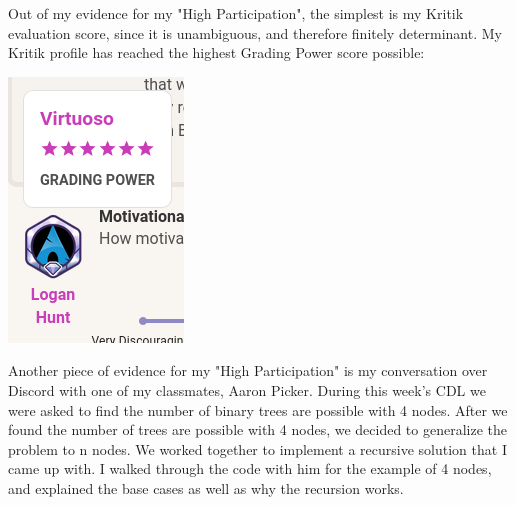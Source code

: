 \documentclass[11pt]{article}
\begin{document}
Out of my evidence for my "High Participation", the simplest is my Kritik evaluation score,
since it is unambiguous, and therefore finitely determinant. My Kritik profile has reached the
highest Grading Power score possible:
\begin{center}
\includegraphics[width=.9\linewidth]{./screenshot.png}
\end{center}

Another piece of evidence for my "High Participation" is my conversation over Discord with one of my
classmates, Aaron Picker. During this week's CDL we were asked to find the number of binary trees are
possible with 4 nodes. After we found the number of trees are possible with 4 nodes, we decided to
generalize the problem to n nodes. We worked together to implement a recursive solution that I came up
with. I walked through the code with him for the example of 4 nodes, and explained the base cases as
well as why the recursion works.
\end{document}
